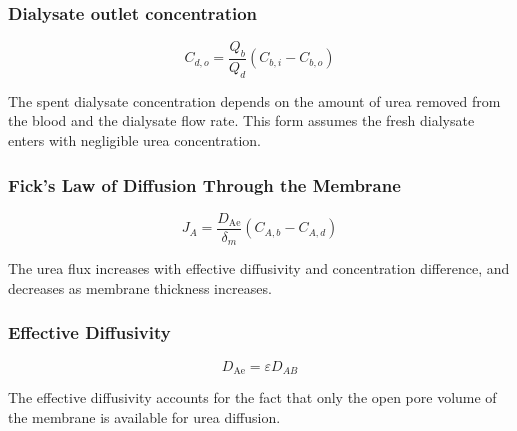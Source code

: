 \documentclass[10.5pt]{article}
\begin{document}
\vspace{-0.2cm}
\subsubsection{Dialysate outlet concentration}
    
\vspace{0.3cm}

    \begin{equation}
     C_{d,o} = \frac{Q_b}{Q_d}(C_{b,i}-C_{b,o})       
    \end{equation}
    
The spent dialysate concentration depends on the amount of urea removed
from the blood and the dialysate flow rate. This form assumes the fresh
dialysate enters with negligible urea concentration.

\subsubsection{Fick's Law of Diffusion Through the Membrane}

\vspace{0.3cm}

\begin{equation}
    J_A =
    \frac{D_{\text{Ae}}}{\delta_m}
    (C_{A,b}-C_{A,d})
\end{equation}

\vspace{-0.2cm}

The urea flux increases with effective diffusivity and concentration
difference, and decreases as membrane thickness increases.


\subsubsection{Effective Diffusivity}

\vspace{0.1cm}

\begin{equation}
    D_{\text{Ae}} = \varepsilon D_{AB}
\end{equation}

\vspace{-0.3cm}

The effective diffusivity accounts for the fact that only the open pore
volume of the membrane is available for urea diffusion.

\vspace{-0.2cm}
\end{document}
